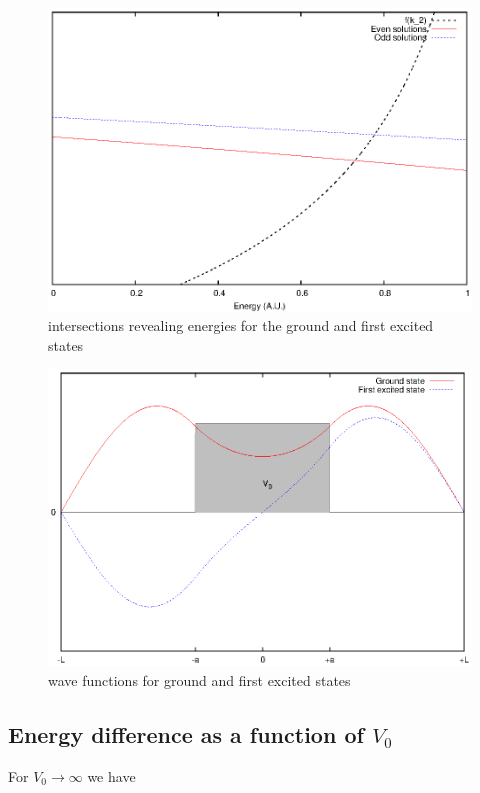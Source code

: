 \documentclass{article}
\begin{document}
\begin{figure}
\centering
\includegraphics{ex_1_3_ground_energies.eps}
\caption{intersections revealing energies for the ground and first excited states}
\label{ex_1_3_ground_energies}
\end{figure}

\begin{figure}
\centering
\includegraphics{ex_1_3_psi.eps}
\caption{wave functions for ground and first excited states}
\label{ex_1_3_psi}
\end{figure}

\subsection{Energy difference as a function of \(V_0\)}
For \(V_0 \rightarrow \infty\) we have
\end{document}
